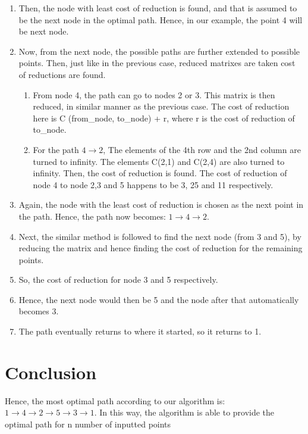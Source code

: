 \documentclass{article}
\begin{document}
\begin{enumerate}
    \item Then, the node with least cost of reduction is found,
and that is assumed to be the next node in the optimal
path. Hence, in our example, the point 4 will be next
node.

    \item Now, from the next node, the possible paths are further
extended to possible points. Then, just like in the
previous case, reduced matrixes are taken cost of
reductions are found.
    \begin{enumerate}
        \item From node 4, the path can go to nodes 2 or 3.
This matrix is then reduced, in similar manner
as the previous case. The cost of reduction here
is C (from\_node, to\_node) + r, where r is the
cost of reduction of to\_node.
        \item For the path $4 \rightarrow 2$, The elements of the 4th
row and the 2nd column are turned to infinity.
The elements C(2,1) and C(2,4) are also turned
to infinity. Then, the cost of reduction is found.
The cost of reduction of node 4 to node 2,3 and
5 happens to be 3, 25 and 11 respectively.
    \end{enumerate}

    \item Again, the node with the least cost of reduction is
chosen as the next point in the path. Hence, the path
now becomes: $1 \rightarrow 4 \rightarrow 2$.
    \item Next, the similar method is followed to find the next
node (from 3 and 5), by reducing the matrix and hence
finding the cost of reduction for the remaining points.
    \item So, the cost of reduction for node 3 and 5 respectively.
    \item Hence, the next node would then be 5 and the node
after that automatically becomes 3.
    \item The path eventually returns to where it started, so it
returns to 1.

\end{enumerate}

\section{Conclusion}
Hence, the most optimal path according to our
algorithm is:
$1 \rightarrow 4 \rightarrow 2 \rightarrow 5 \rightarrow 3 \rightarrow 1$.
In this way, the algorithm is able to provide the
optimal path for n number of inputted points
\end{document}

